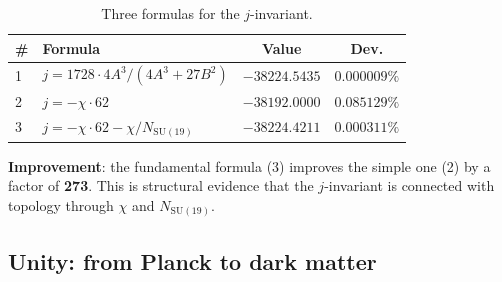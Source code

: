 \documentclass[11pt,a4paper]{article}
\newcommand{\SU}{\mathrm{SU}}
\theoremstyle{definition}
\begin{document}
\begin{table}[htbp]
\centering
\caption{Three formulas for the $j$-invariant.}
\label{tab:j-invariant-three}
\begin{tabular}{llcc}
\toprule
\# & Formula & Value & Dev. \\
\midrule
1 & $j = 1728 \cdot 4A^{3}/(4A^{3} + 27B^{2})$ &
    $-38224.5435$ & $0.000009\%$ \\[0.3em]
2 & $j = -\chi \cdot 62$ &
    $-38192.0000$ & $0.085129\%$ \\[0.3em]
3 & $j = -\chi \cdot 62 - \chi/N_{\SU(19)}$ &
    $-38224.4211$ & $\mathbf{0.000311\%}$ \\
\bottomrule
\end{tabular}
\end{table}

\noindent
\textbf{Improvement}: the fundamental formula (3) improves the simple one (2)
by a factor of \textbf{273}. This is structural evidence that the
$j$-invariant is connected with topology through $\chi$ and $N_{\SU(19)}$.

\subsection{Unity: from Planck to dark matter}
\label{subsec:gravity-unity}
\end{document}
